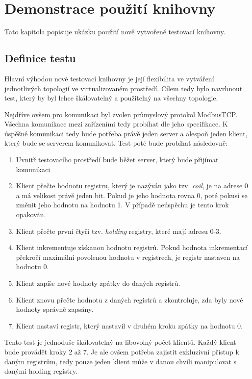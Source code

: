 \chapter{Demonstrace použití knihovny}

Tato kapitola popisuje ukázku použití nově vytvořené testovací knihovny.


\section{Definice testu}

Hlavní výhodou nové testovací knihovny je její flexibilita ve vytváření jednotlivých topologií ve virtualizovaném prostředí. Cílem tedy bylo navrhnout test, který by byl lehce škálovatelný a použitelný na všechny topologie. 

Nejdříve ovšem pro komunikaci byl zvolen průmyslový protokol ModbusTCP.  Všechna komunikace mezi zařízeními tedy probíhat dle jeho specifikace. K úspěšné komunikaci tedy bude potřeba právě jeden server a alespoň jeden klient, který bude se serverem komunikovat. Test poté bude probíhat následovně:

\begin{enumerate}
    \item Uvnitř testovacího prostředí bude běžet server, který bude přijímat komunikaci
    \item Klient přečte hodnotu registru, který je nazýván jako tzv. \textit{coil}, je na adrese 0 a má velikost právě jeden bit. Pokud je jeho hodnota rovna 0, poté pokusí se změnit jeho hodnotu na hodnotu 1. V případě neúspěchu je tento krok opakován.
    \item Klient přečte první čtyři tzv. \textit{holding} registry, které mají adresu 0-3. 
    \item Klient inkrementuje získanou hodnotu registrů. Pokud hodnota inkrementací překročí maximální povolenou hodnotu v registrech, je registr nastaven na hodnotu 0.
    \item Klient zapíše nové hodnoty zpátky do daných registrů.
    \item Klient znovu přečte hodnotu z daných registrů a zkontroluje, zda byly nové hodnoty správně zapsány.
    \item Klient nastaví registr, který nastavil v druhém kroku zpátky na hodnotu 0.
\end{enumerate}

Tento test je jednoduše škálovatelný na libovolný počet klientů. Každý klient bude provádět kroky 2 až 7. Je ale ovšem potřeba zajistit exkluzivní přístup k daným registrům, tedy pouze jeden klient může v danou chvíli manipulovat s danými holding registry. 

